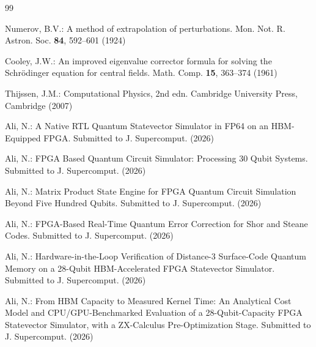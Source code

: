 \documentclass[pdflatex,sn-mathphys,Numbered]{sn-jnl}
\begin{document}
\begin{thebibliography}{99}

 Numerov, B.V.: A method of extrapolation of perturbations. Mon. Not. R. Astron. Soc. \textbf{84}, 592--601 (1924)

 Cooley, J.W.: An improved eigenvalue corrector formula for solving the Schr\"odinger equation for central fields. Math. Comp. \textbf{15}, 363--374 (1961)

 Thijssen, J.M.: Computational Physics, 2nd edn. Cambridge University Press, Cambridge (2007)

 Ali, N.: A Native RTL Quantum Statevector Simulator in FP64 on an HBM-Equipped FPGA. Submitted to J. Supercomput. (2026)

 Ali, N.: FPGA Based Quantum Circuit Simulator: Processing 30 Qubit Systems. Submitted to J. Supercomput. (2026)

 Ali, N.: Matrix Product State Engine for FPGA Quantum Circuit Simulation Beyond Five Hundred Qubits. Submitted to J. Supercomput. (2026)

 Ali, N.: FPGA-Based Real-Time Quantum Error Correction for Shor and Steane Codes. Submitted to J. Supercomput. (2026)

 Ali, N.: Hardware-in-the-Loop Verification of Distance-3 Surface-Code Quantum Memory on a 28-Qubit HBM-Accelerated FPGA Statevector Simulator. Submitted to J. Supercomput. (2026)

 Ali, N.: From HBM Capacity to Measured Kernel Time: An Analytical Cost Model and CPU/GPU-Benchmarked Evaluation of a 28-Qubit-Capacity FPGA Statevector Simulator, with a ZX-Calculus Pre-Optimization Stage. Submitted to J. Supercomput. (2026)

\end{thebibliography}
\end{document}
